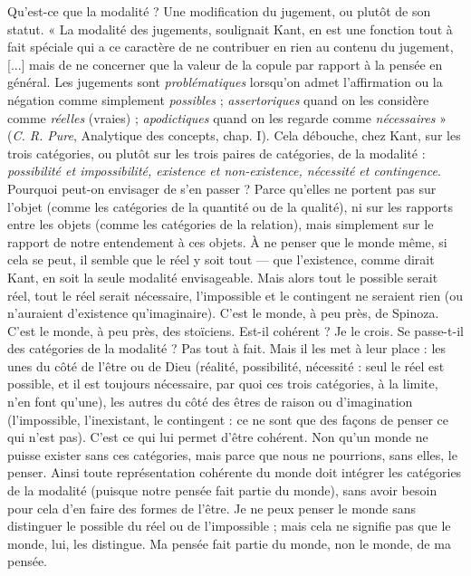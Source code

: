 Qu'est-ce que la modalité ? Une modification du jugement, ou plutôt de
son statut. « La modalité des jugements, soulignait Kant, en est une fonction
tout à fait spéciale qui a ce caractère de ne contribuer en rien au contenu du
jugement, [...] mais de ne concerner que la valeur de la copule par rapport à la
pensée en général. Les jugements sont {\it problématiques} lorsqu'on admet l’affirmation
ou la négation comme simplement {\it possibles} ; {\it assertoriques} quand on les
considère comme {\it réelles} (vraies) ; {\it apodictiques} quand on les regarde comme
{\it nécessaires} » ({\it C. R. Pure}, Analytique des concepts, chap. I). Cela débouche, chez
Kant, sur les trois catégories, ou plutôt sur les trois paires de catégories, de la
modalité : {\it possibilité et impossibilité, existence et non-existence, nécessité et contingence}.
Pourquoi peut-on envisager de s’en passer ? Parce qu’elles ne portent pas
sur l’objet (comme les catégories de la quantité ou de la qualité), ni sur les rapports
entre les objets (comme les catégories de la relation), mais simplement sur
le rapport de notre entendement à ces objets. À ne penser que le monde même,
si cela se peut, il semble que le réel y soit tout — que l'existence, comme dirait
Kant, en soit la seule modalité envisageable. Mais alors tout le possible serait
réel, tout le réel serait nécessaire, l'impossible et le contingent ne seraient rien
(ou n’auraient d’existence qu’imaginaire). C’est le monde, à peu près, de Spinoza.
C’est le monde, à peu près, des stoïciens. Est-il cohérent ? Je le crois. Se
passe-t-il des catégories de la modalité ? Pas tout à fait. Mais il les met à leur
place : les unes du côté de l’être ou de Dieu (réalité, possibilité, nécessité : seul
le réel est possible, et il est toujours nécessaire, par quoi ces trois catégories, à la
limite, n’en font qu’une), les autres du côté des êtres de raison ou d’imagination
(l’impossible, l’inexistant, le contingent : ce ne sont que des façons de
penser ce qui n’est pas). C’est ce qui lui permet d’être cohérent. Non qu’un
monde ne puisse exister sans ces catégories, mais parce que nous ne pourrions,
sans elles, le penser. Ainsi toute représentation cohérente du monde doit intégrer
les catégories de la modalité (puisque notre pensée fait partie du monde),
sans avoir besoin pour cela d’en faire des formes de l'être. Je ne peux penser le
monde sans distinguer le possible du réel ou de l’impossible ; mais cela ne
signifie pas que le monde, lui, les distingue. Ma pensée fait partie du monde,
non le monde, de ma pensée.

